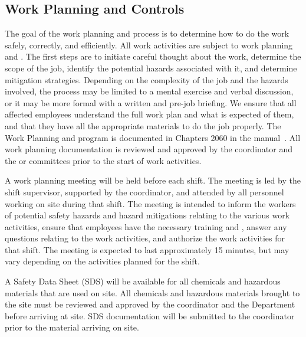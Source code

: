 \subsection{Work Planning and Controls}


The goal of the work planning and  process is to determine how to do
the work safely, correctly, and efficiently. All work activities
are subject to work planning and . 
The first steps are to 
initiate careful thought about the work, determine the scope of the job, identify the potential hazards associated with it, and determine mitigation strategies.
Depending on the complexity of the job and the hazards involved, the  process
may be limited to a mental exercise and verbal discussion, or it may be more
formal with a written  and pre-job briefing.
We ensure that all affected employees understand the full work plan and what is expected of them, and that they have all the appropriate materials to do the job properly.
The Work Planning and  program is documented in Chapters 2060 in the  manual~\cite{feshm}. All work planning documentation is reviewed and
approved by the   coordinator and the 
 or  committees prior to the start of work activities.

A work planning meeting will be held %
before each shift. %
The meeting %
is led by the shift supervisor, supported by the   coordinator, and
attended by all personnel working on site during that shift. The meeting is intended to inform the workers of potential safety hazards and
hazard mitigations relating to the various work activities, ensure
that employees have the necessary  training and , answer any
questions relating to the work activities, and authorize the work
activities for that shift. The meeting is expected to last approximately 15 minutes, but 
may vary depending on the activities planned for the shift. 

A Safety Data Sheet (SDS) will be available for all chemicals and
hazardous materials that are used on site. All chemicals and hazardous
materials brought to the  site must be reviewed and approved by the
  coordinator and the  
Department before arriving at site.  SDS documentation will be
submitted to the   coordinator prior to the
material arriving on site.

